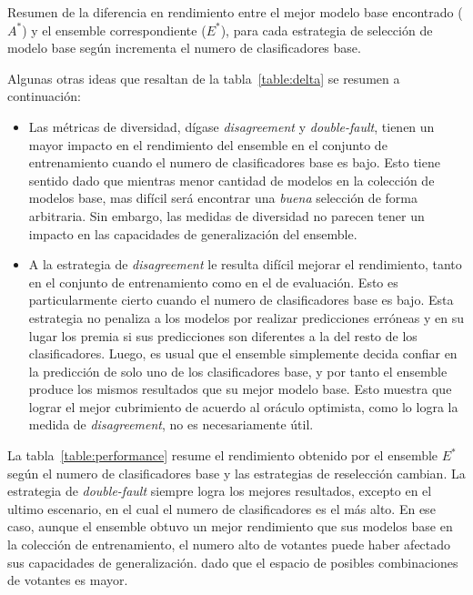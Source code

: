 \begin{table}[!htb]
    \caption{Resumen de la diferencia en rendimiento entre el mejor modelo base encontrado ($A^*$) y el ensemble correspondiente ($E^*$), para cada estrategia de selección de modelo base según incrementa el numero de clasificadores base.}
    \label{table:delta}
\end{table}

Algunas otras ideas que resaltan de la tabla~\ref{table:delta} se resumen a continuación:

\begin{itemize}
    \item
    Las métricas de diversidad, dígase \emph{disagreement} y \emph{double-fault}, tienen un mayor impacto en el rendimiento del ensemble en el conjunto de entrenamiento cuando el numero de clasificadores base es bajo.
    Esto tiene sentido dado que mientras menor cantidad de modelos en la colección de modelos base, mas difícil será encontrar una \textit{buena} selección de forma arbitraria.
    Sin embargo, las medidas de diversidad no parecen tener un impacto en las capacidades de generalización del ensemble.
    
    \item
    A la estrategia de \emph{disagreement} le resulta difícil mejorar el rendimiento, tanto en el conjunto de entrenamiento como en el de evaluación.
    Esto es particularmente cierto cuando el numero de clasificadores base es bajo.
    Esta estrategia no penaliza a los modelos por realizar predicciones erróneas y en su lugar los premia si sus predicciones son diferentes a la del resto de los clasificadores.
    Luego, es usual que el ensemble simplemente decida confiar en la predicción de solo uno de los clasificadores base, y por tanto el ensemble produce los mismos resultados que su mejor modelo base.
    Esto muestra que lograr el mejor cubrimiento de acuerdo al oráculo optimista, como lo logra la medida de \emph{disagreement}, no es necesariamente útil.
\end{itemize}

La tabla~\ref{table:performance} resume el rendimiento obtenido por el ensemble $E^*$ según el numero de clasificadores base y las estrategias de reselección cambian.
La estrategia de \emph{double-fault} siempre logra los mejores resultados, excepto en el ultimo escenario, en el cual el numero de clasificadores es el más alto.
En ese caso, aunque el ensemble obtuvo un mejor rendimiento que sus modelos base en la colección de entrenamiento, el numero alto de votantes puede haber afectado sus capacidades de generalización. dado que el espacio de posibles combinaciones de votantes es mayor.

